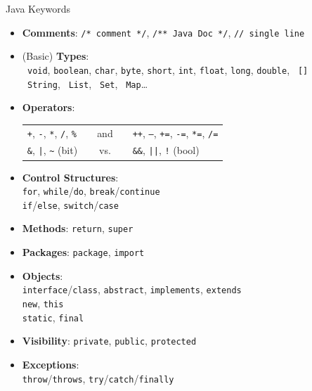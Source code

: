 \documentclass[English,c,%
hyperref={%
    pdftitle={FISA-DE2 OOP in Java},%
    pdfauthor={Muller, Gravier, Laforest, Subercaze},%
    pdfsubject={OOP in Java},%
    pdfkeywords={OOP, Java},%
    colorlinks=true,%
    urlcolor=blue,%
    linkcolor=%
    },%
xcolor={pdftex,svgnames} %
]{beamer}
\begin{document}
\begin{frame}{Java Keywords}

  { \footnotesize
  \begin{itemize}

    \item \textbf{Comments}: \texttt{/* comment */}, \texttt{/** Java Doc */}, \texttt{// single line} \\

    \item (Basic) \textbf{Types}: \\
    \texttt{\color{red} void}, \texttt{boolean}, \texttt{char}, \texttt{byte},
    \texttt{short}, \texttt{int}, \texttt{float}, \texttt{long},
    \texttt{double}, \texttt{\color{red} []}\\
    \texttt{\color{red} String}, \texttt{\color{red} List}, \texttt{\color{red} Set}, \texttt{\color{red} Map}\ldots{}

    \item \textbf{Operators}: \\
    \begin{tabular}{lp{.5cm}cp{.5cm}l}
    \texttt{+}, \texttt{-}, \texttt{*}, \texttt{/}, \texttt{\%} && and &&
    {\color{red} \texttt{++}, \texttt{--}, \texttt{+=}, \texttt{-=}, \texttt{*=}, \texttt{/=}} \\
    \texttt{\&}, \texttt{|}, \texttt{\textasciitilde} (bit) && vs. && { \color{red} \texttt{\&\&}, \texttt{||}, \texttt{!}} (bool)\\
    \end{tabular}

    \item \textbf{Control Structures}: \\
    \texttt{for}, \texttt{while}/\texttt{do},
    \texttt{break}/\texttt{continue}\\
    \texttt{if}/\texttt{else}, \texttt{switch}/\texttt{case}

    \item \textbf{Methods}: \texttt{return}, \texttt{super}

    \item \textbf{Packages}: \texttt{package}, \texttt{import}

    \item \textbf{Objects}:\\
    \texttt{interface}/\texttt{class}, \texttt{abstract},
    \texttt{implements}, \texttt{extends}\\
    \texttt{new}, \texttt{this}\\
    \texttt{static}, \texttt{final}

    \item \textbf{Visibility}: \texttt{private}, \texttt{public}, \texttt{protected}

    \item \textbf{Exceptions}:\\
    \texttt{throw}/\texttt{throws}, \texttt{try}/\texttt{catch}/\texttt{finally}

  \end{itemize}
}

\end{frame}
\end{document}
